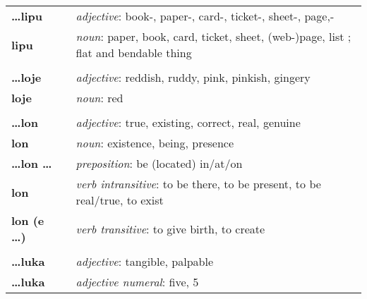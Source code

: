 \begin{supertabular}{p{2,5cm}|ll}
    \textbf{\dots lipu}          &  & \textit{adjective}: book-, paper-, card-, ticket-, sheet-, page,-                                          \\
    \textbf{lipu}                &  & \textit{noun}: paper, book, card, ticket, sheet, (web-)page, list ; flat and bendable thing                \\
                                 &  &                                                                                                            \\ %
    \textbf{\dots loje}          &  & \textit{adjective}: reddish, ruddy, pink, pinkish, gingery                                                 \\
    \textbf{loje}                &  & \textit{noun}: red                                                                                         \\
                                 &  &                                                                                                            \\ %
    \textbf{\dots lon}           &  & \textit{adjective}: true, existing, correct, real, genuine                                                 \\
    \textbf{lon}                 &  & \textit{noun}: existence, being, presence                                                                  \\
    \textbf{\dots lon \dots}     &  & \textit{preposition}: be (located) in/at/on                                                                \\
    \textbf{lon}                 &  & \textit{verb intransitive}: to be there, to be present, to be real/true, to exist                          \\
    \textbf{lon (e \dots)}       &  & \textit{verb transitive}: to give birth, to create                                                         \\
                                 &  &                                                                                                            \\ %
    \textbf{\dots luka}          &  & \textit{adjective}: tangible, palpable                                                                     \\
    \textbf{\dots luka}          &  & \textit{adjective numeral}: five, 5                                                                        \\

\end{supertabular}
